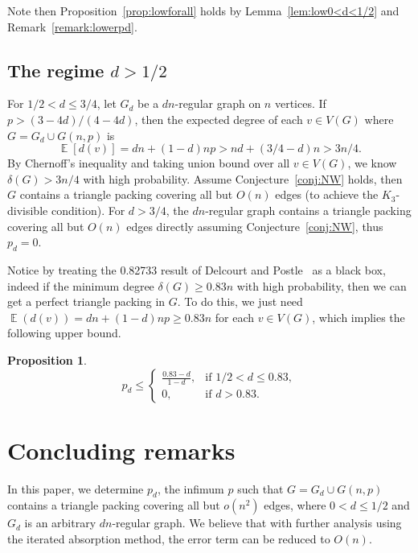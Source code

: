 \documentclass[11pt,reqno]{amsart}
\newtheorem{proposition}[theorem]{Proposition}
\theoremstyle{definition}
\theoremstyle{remark}
\newcommand\E{\operatorname{\mathbb{E}}}
\renewcommand\leq{\leqslant}
\renewcommand\geq{\geqslant}
\renewcommand\le{\leqslant}
\begin{document}
Note then Proposition~\ref{prop:lowforall} holds by Lemma~\ref{lem:low0<d<1/2} and Remark~\ref{remark:lowerpd}.



\subsection{The regime $d>1/2$}


For $1/2<d\leq 3/4$, let $G_d$ be a $dn$-regular graph on $n$ vertices. If $p>(3-4d)/(4-4d)$, then the expected degree of each $v\in V(G)$ where $G=G_d\cup G(n,p)$ is
$$\E[d(v)]=dn+(1-d)np> nd+ (3/4-d)n>3n/4.$$
By Chernoff's inequality and taking union bound over all $v\in V(G)$, we know $\delta(G)>3n/4$ with high probability. Assume Conjecture~\ref{conj:NW} holds, then $G$ contains a triangle packing covering all but $O(n)$ edges (to achieve the $K_3$-divisible condition). For $d>3/4$, the $dn$-regular graph contains a triangle packing covering all but $O(n)$ edges directly assuming Conjecture~\ref{conj:NW}, thus $p_d=0$.

Notice by treating the 0.82733 result of Delcourt and Postle~\cite{DelcourtPostle} as a black box, indeed if the minimum degree $\delta(G)\geq 0.83n$ with high probability, then we can get a perfect triangle packing in $G$. To do this, we just need $\E(d(v))=dn+(1-d)np\geq 0.83 n$ for each $v\in V(G)$, which implies the following upper bound.

\begin{proposition}
\begin{equation*}\label{eq:low}
p_d\leq
\begin{cases}
\frac{0.83-d}{1-d}, & \text{if } 1/2< d\leq 0.83, \\[4pt]
0, & \text{if } d>0.83.
\end{cases}
\end{equation*}
\end{proposition}





\section{Concluding remarks}\label{sec:concluding}

In this paper, we determine $p_d$, the infimum $p$ such that $G=G_d\cup G(n,p)$ contains a triangle packing covering all but $o(n^2)$ edges, where $0<d\le 1/2$ and $G_d$ is an arbitrary $dn$-regular graph. We believe that with further analysis using the iterated absorption method, the error term can be reduced to $O(n)$.
\end{document}
